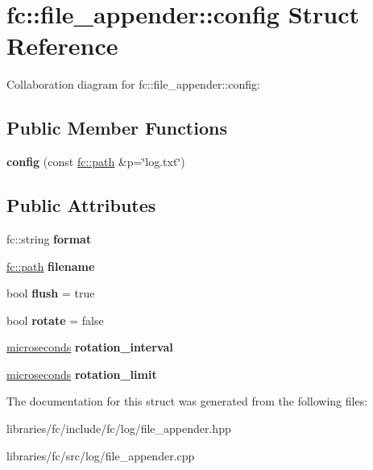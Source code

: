 \hypertarget{structfc_1_1file__appender_1_1config}{}\section{fc\+:\+:file\+\_\+appender\+:\+:config Struct Reference}
\label{structfc_1_1file__appender_1_1config}


Collaboration diagram for fc\+:\+:file\+\_\+appender\+:\+:config\+:
\subsection*{Public Member Functions}
\begin{DoxyCompactItemize}
\item 
\mbox{\label{structfc_1_1file__appender_1_1config_a5926e35e7dce2a8ec393d50672634fb4}} 
{\bfseries config} (const \mbox{\hyperlink{classfc_1_1path}{fc\+::path}} \&p=\char`\"{}log.\+txt\char`\"{})
\end{DoxyCompactItemize}
\subsection*{Public Attributes}
\begin{DoxyCompactItemize}
\item 
\mbox{\label{structfc_1_1file__appender_1_1config_a9526b870e8f12aa0b1217187f2d19768}} 
fc\+::string {\bfseries format}
\item 
\mbox{\label{structfc_1_1file__appender_1_1config_acfd0ca45af92423954f29c3376591161}} 
\mbox{\hyperlink{classfc_1_1path}{fc\+::path}} {\bfseries filename}
\item 
\mbox{\label{structfc_1_1file__appender_1_1config_a336ab891d113c3d6266f16b40f0afeec}} 
bool {\bfseries flush} = true
\item 
\mbox{\label{structfc_1_1file__appender_1_1config_a38692f04146205b9d212ade09e00944c}} 
bool {\bfseries rotate} = false
\item 
\mbox{\label{structfc_1_1file__appender_1_1config_a39880b4aeef0c7c27c4f420712cd5ebf}} 
\mbox{\hyperlink{classfc_1_1microseconds}{microseconds}} {\bfseries rotation\+\_\+interval}
\item 
\mbox{\label{structfc_1_1file__appender_1_1config_ae34c1c1b64fdb94736dbbc5b190a9fa0}} 
\mbox{\hyperlink{classfc_1_1microseconds}{microseconds}} {\bfseries rotation\+\_\+limit}
\end{DoxyCompactItemize}


The documentation for this struct was generated from the following files\+:\begin{DoxyCompactItemize}
\item 
libraries/fc/include/fc/log/file\+\_\+appender.\+hpp\item 
libraries/fc/src/log/file\+\_\+appender.\+cpp\end{DoxyCompactItemize}
